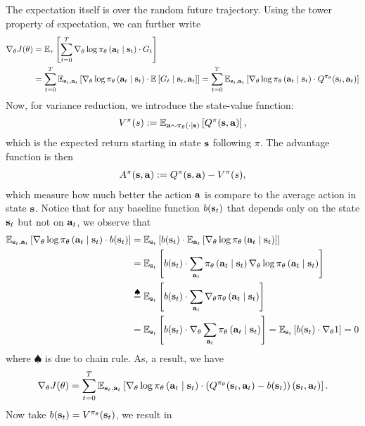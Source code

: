 \documentclass[11pt]{article}  %
\begin{document}
The expectation itself is over the random future trajectory.
Using the tower property of expectation, we can further write 
\begin{align*}
  \nabla_{\theta} J(\theta) &= \mathbb{E}_{\tau}\left[\sum_{t=0}^{T}\nabla_\theta \log \pi_{\theta}\left( \mathbf{a}_t \mid \mathbf{s}_t \right) \cdot G_t\right]\\
  &= \sum_{t=0}^{T}\mathbb{E}_{\mathbf{s}_t, \mathbf{a}_t}\left[\nabla_{\theta} \log\pi_{\theta}\left( \mathbf{a}_t \mid \mathbf{s}_t \right)\cdot\mathbb{E}\left[G_t \mid \mathbf{s}_t, \mathbf{a}_t\right]\right] =  \sum_{t=0}^{T}\mathbb{E}_{\mathbf{s}_t, \mathbf{a}_t}\left[\nabla_{\theta} \log\pi_{\theta}\left( \mathbf{a}_t \mid \mathbf{s}_t \right)\cdot Q^{\pi_\theta}(\mathbf{s}_t, \mathbf{a}_t)\right]
\end{align*}
Now, for variance reduction, we introduce the state-value function:
\begin{align*}
  V^{\pi}(s) := \mathbb{E}_{\mathbf{a} \sim \pi_{\theta}\left( \cdot \mid \mathbf{s} \right)}\left[Q^{\pi}(\mathbf{s}, \mathbf{a})\right],
\end{align*}
which is the expected return starting in state $\mathbf{s}$ following $\pi$.
The advantage function is then 
\begin{align*}
  A^{\pi}(\mathbf{s}, \mathbf{a}) := Q^{\pi}(\mathbf{s}, \mathbf{a}) - V^{\pi}(s),
\end{align*}
which measure how much better the action $\mathbf{a}$ is compare to the average action in state $\mathbf{s}$.
Notice that for any baseline function $b(\mathbf{s}_t)$ that depends only on the state $\mathbf{s}_t$ but not on $\mathbf{a}_t$, we observe that 
\begin{align*}
  \mathbb{E}_{\mathbf{s}_t, \mathbf{a}_t}\left[\nabla_\theta \log \pi_{\theta}\left( \mathbf{a}_t \mid \mathbf{s}_t \right) \cdot b(\mathbf{s}_t)\right] &= \mathbb{E}_{\mathbf{s}_t}\left[b(\mathbf{s}_t) \cdot \mathbb{E}_{\mathbf{a}_t}\left[\nabla_\theta \log \pi_{\theta}\left( \mathbf{a}_t \mid \mathbf{s}_t \right)\right]\right] \\
  &= \mathbb{E}_{\mathbf{s}_t}\left[b(\mathbf{s}_t) \cdot \sum_{\mathbf{a}_t}\pi_{\theta}\left( \mathbf{a}_t \mid \mathbf{s}_t \right)\nabla_\theta \log \pi_{\theta}\left( \mathbf{a}_t \mid \mathbf{s}_t \right)\right] \\
  &\overset{\spadesuit}{=} \mathbb{E}_{\mathbf{s}_t}\left[b(\mathbf{s}_t) \cdot \sum_{\mathbf{a}_t}\nabla_\theta \pi_{\theta}\left( \mathbf{a}_t \mid \mathbf{s}_t \right)\right] \\
  &= \mathbb{E}_{\mathbf{s}_t}\left[b(\mathbf{s}_t) \cdot \nabla_\theta \sum_{\mathbf{a}_t} \pi_{\theta}\left( \mathbf{a}_t \mid \mathbf{s}_t \right)\right] = \mathbb{E}_{\mathbf{s}_t}\left[b(\mathbf{s}_t) \cdot \nabla_\theta 1\right] = 0
\end{align*} 
where $\spadesuit$ is due to chain rule.
As, a result, we have 
\begin{align*}
  \nabla_{\theta} J(\theta) = \sum_{t=0}^{T}\mathbb{E}_{\mathbf{s}_t, \mathbf{a}_t}\left[\nabla_{\theta}\log \pi_{\theta}\left( \mathbf{a}_t \mid \mathbf{s}_t \right)\cdot \left( Q^{\pi_\theta}(\mathbf{s}_t, \mathbf{a}_t) - b(\mathbf{s}_t) \right)(\mathbf{s}_t, \mathbf{a}_t)\right].
\end{align*} 
Now take $b(\mathbf{s}_t) = V^{\pi_\theta}(\mathbf{s}_t)$, we result in 
\end{document}
